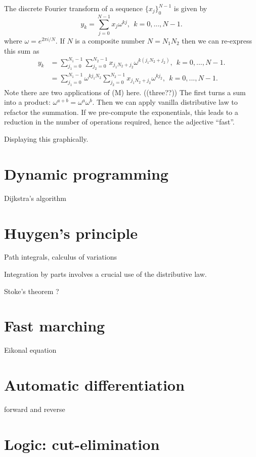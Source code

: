 \documentclass[12pt]{article}
\begin{document}
The discrete Fourier transform of a sequence $\{x_j\}_0^{N-1}$
is given by
$$
    y_k = \sum_{j=0}^{N-1} x_j \omega^{kj}, \ \ k=0,...,N-1.
$$
where $\omega=e^{2\pi i/N}.$
If $N$ is a composite number $N=N_1 N_2$ then we can re-express this sum as
\begin{align*}
    y_k &= \sum_{j_1=0}^{N_1-1} \sum_{j_2=0}^{N_2-1} x_{j_1 N_2 + j_2}
            \omega^{k (j_1 N_2 + j_2)}, \ \ k=0,...,N-1. \\
        &= \sum_{j_1=0}^{N_1-1}
            \omega^{k {j_1 N_2}}
            \sum_{j_2=0}^{N_2-1} x_{j_1 N_2 + j_2}
            \omega^{k {j_2}}, \ \ k=0,...,N-1.
\end{align*}
Note there are two applications of (M) here. ((three??))
The first turns a sum into a product: $\omega^{a+b}=\omega^a \omega^b.$
Then we can apply vanilla distributive law to refactor the summation.
If we pre-compute the exponentials, this leads to a reduction in
the number of operations required, hence the adjective ``fast''.

Displaying this graphically.


\section{Dynamic programming}

Dijkstra's algorithm

\section{Huygen's principle}

Path integrals, calculus of variations

Integration by parts involves a crucial use of the distributive law.

Stoke's theorem ? %

\section{Fast marching}

Eikonal equation

\section{Automatic differentiation}

forward and reverse

\section{Logic: cut-elimination}
\end{document}
